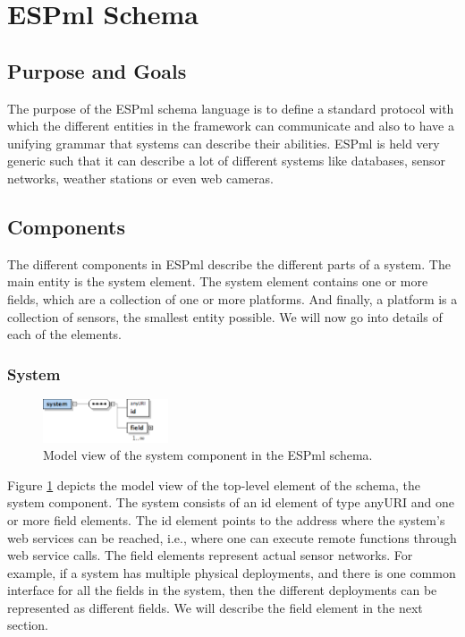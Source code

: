 \section{ESPml Schema}

\subsection{Purpose and Goals}

The purpose of the ESPml schema language is to define a standard
protocol with which the different entities in the framework 
can communicate and also to have a unifying grammar that systems 
can describe their abilities. ESPml is held very generic such that it
can describe a lot of different systems like databases, sensor
networks, weather stations or even web cameras.

\subsection{Components}

The different components in ESPml describe the different parts of a
system. The main entity is the system element. The system element
contains one or more fields, which are a collection of one or more
platforms. And finally, a platform is a collection of sensors, the
smallest entity possible. We will now go into details of each of the
elements.

\subsubsection{System}
\begin{figure}[t]
  \begin{center}
    \includegraphics[width=0.33\textwidth]{images/system}
    \caption{Model view of the system component in the ESPml schema.}
    \label{fig:system}
  \end{center}
\end{figure}
Figure \ref{fig:system} depicts the model view of the top-level
element of the schema, the system component. The system consists of an
id element of type anyURI and one or more field elements. The id
element points to the address where the system's web services can be
reached, i.e., where one can execute remote functions through web
service calls. The field elements represent actual sensor
networks. For example, if a system has multiple physical deployments,
and there is one common interface for all the fields in the system,
then the different deployments can be represented as different
fields. We will describe the field element in the next section.



